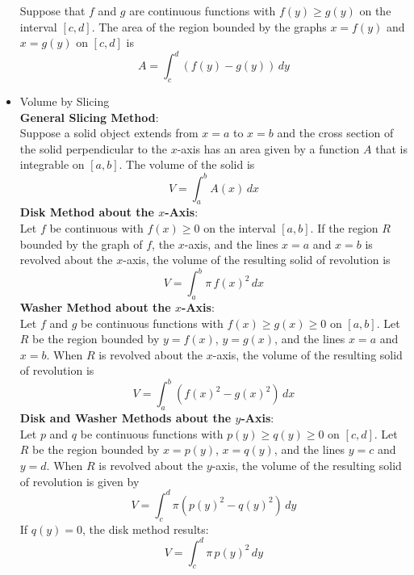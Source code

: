 \documentclass{article}
\begin{document}
\begin{itemize}
        Suppose that $f$ and $g$ are continuous functions with $f(y) \geq g(y)$ on the interval $[c,d]$. The area of the region bounded by the graphs $x = f(y)$ and $x = g(y)$ on $[c,d]$ is
        $$A = \int_c^d{\left(f(y) - g(y)\right)\,dy}$$
    \item Volume by Slicing \\
        \textbf{General Slicing Method}: \\
        Suppose a solid object extends from $x = a$ to $x = b$ and the cross section of the solid perpendicular to the $x$-axis has an area given by a function $A$ that is integrable on $[a,b]$. The volume of the solid is
        $$V = \int_a^b{A(x)\,dx}$$
        \textbf{Disk Method about the $x$-Axis}: \\
        Let $f$ be continuous with $f(x) \geq 0$ on the interval $[a,b]$. If the region $R$ bounded by the graph of $f$, the $x$-axis, and the lines $x = a$ and $x = b$ is revolved about the $x$-axis, the volume of the resulting solid of revolution is
        $$V = \int_a^b{\pi\,f(x)^2\,dx}$$
        \textbf{Washer Method about the $x$-Axis}: \\
        Let $f$ and $g$ be continuous functions with $f(x) \geq g(x) \geq 0$ on $[a,b]$. Let $R$ be the region bounded by $y = f(x)$, $y = g(x)$, and the lines $x = a$ and $x = b$. When $R$ is revolved about the $x$-axis, the volume of the resulting solid of revolution is
        $$V = \int_a^b{\left(f(x)^2 - g(x)^2\right)\,dx}$$
        \textbf{Disk and Washer Methods about the $y$-Axis}: \\
        Let $p$ and $q$ be continuous functions with $p(y) \geq q(y) \geq 0$ on $[c,d]$. Let $R$ be the region bounded by $x = p(y)$, $x = q(y)$, and the lines $y = c$ and $y = d$. When $R$ is revolved about the $y$-axis, the volume of the resulting solid of revolution is given by
        $$V = \int_c^d{\pi\left(p(y)^2 - q(y)^2\right)\,dy}$$
        If $q(y) = 0$, the disk method results:
        $$V = \int_c^d{\pi\,p(y)^2\,dy}$$
\end{itemize}
\end{document}
